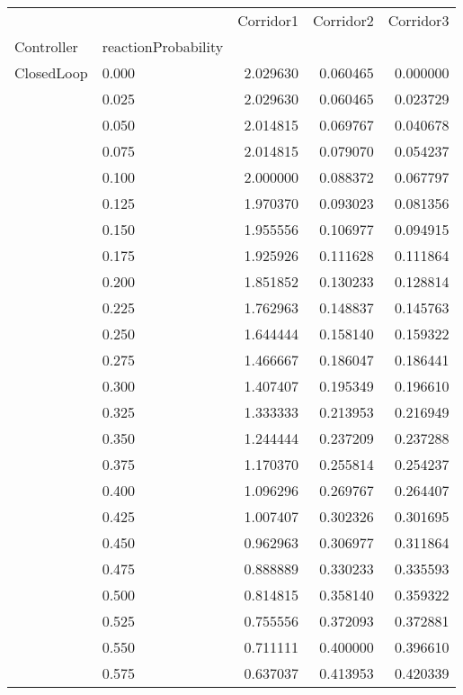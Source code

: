 \begin{tabular}{llrrr}
\toprule
         &       &  Corridor1 &  Corridor2 &  Corridor3 \\
Controller & reactionProbability &            &            &            \\
\midrule
ClosedLoop & 0.000 &   2.029630 &   0.060465 &   0.000000 \\
         & 0.025 &   2.029630 &   0.060465 &   0.023729 \\
         & 0.050 &   2.014815 &   0.069767 &   0.040678 \\
         & 0.075 &   2.014815 &   0.079070 &   0.054237 \\
         & 0.100 &   2.000000 &   0.088372 &   0.067797 \\
         & 0.125 &   1.970370 &   0.093023 &   0.081356 \\
         & 0.150 &   1.955556 &   0.106977 &   0.094915 \\
         & 0.175 &   1.925926 &   0.111628 &   0.111864 \\
         & 0.200 &   1.851852 &   0.130233 &   0.128814 \\
         & 0.225 &   1.762963 &   0.148837 &   0.145763 \\
         & 0.250 &   1.644444 &   0.158140 &   0.159322 \\
         & 0.275 &   1.466667 &   0.186047 &   0.186441 \\
         & 0.300 &   1.407407 &   0.195349 &   0.196610 \\
         & 0.325 &   1.333333 &   0.213953 &   0.216949 \\
         & 0.350 &   1.244444 &   0.237209 &   0.237288 \\
         & 0.375 &   1.170370 &   0.255814 &   0.254237 \\
         & 0.400 &   1.096296 &   0.269767 &   0.264407 \\
         & 0.425 &   1.007407 &   0.302326 &   0.301695 \\
         & 0.450 &   0.962963 &   0.306977 &   0.311864 \\
         & 0.475 &   0.888889 &   0.330233 &   0.335593 \\
         & 0.500 &   0.814815 &   0.358140 &   0.359322 \\
         & 0.525 &   0.755556 &   0.372093 &   0.372881 \\
         & 0.550 &   0.711111 &   0.400000 &   0.396610 \\
         & 0.575 &   0.637037 &   0.413953 &   0.420339 \\

\end{tabular}
